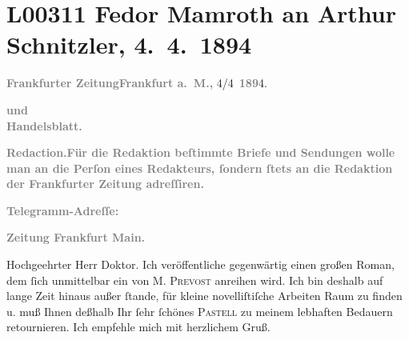 

\section[Fedor Mamroth an Arthur Schnitzler, 4. 4. 1894]{L00311 Fedor Mamroth an Arthur Schnitzler, 4. 4. 1894}
\nopagebreak{}
\rehead{ }\normalsize\beginnumbering{}
\toendnotes[C]{\smallbreak\pagebreak[2]}
\toendnotes[C]{\smallbreak}
\pstart
           {\pb}\textcolor{gray}{\textbf{Frankfurter Zeitung}}\hfill \textcolor{gray}{\textbf{Frankfurt a. M.,}}{ }4/4 \textcolor{gray}{\textbf{189}}4.\pend
           
\pstart
           \textcolor{gray}{\textbf{und}}{\\}\textcolor{gray}{\textbf{Handelsblatt.}}\pend
           
\pstart
           \textcolor{gray}{\textbf{Redaction.\noindent{}\textcolor{gray}{\textbf{Für die Redaktion beſtimmte Briefe und Sendungen
                              wolle man  an die Perſon eines
                              Redakteurs, ſondern ſtets \textbf{an die Redaktion der
                                 Frankfurter Zeitung} adreſſiren}}.}}\pend
           
\pstart
           \textcolor{gray}{\textbf{Telegramm-Adreſſe:}}\pend
           
\pstart
           \textcolor{gray}{\textbf{Zeitung Frankfurt Main.}}\pend
           
\pstart{}Hochgeehrter Herr Doktor.\pend\vspace{0.5em}
\pstart
           Ich veröffentliche gegenwärtig einen großen Roman, dem ſich unmittelbar ein \label{K_L00311-1v}\label{K_L00311-1} von \textsc{M. Prevost} anreihen wird. Ich bin deshalb auf lange Zeit hinaus außer ſtande, für kleine
               novelliſtiſche Arbeiten Raum zu finden u. muß Ihnen deßhalb Ihr ſehr ſchönes \textsc{Pastell} zu meinem lebhaften Bedauern retournieren. Ich empfehle mich mit herzlichem
               Gruß.\pend
           
